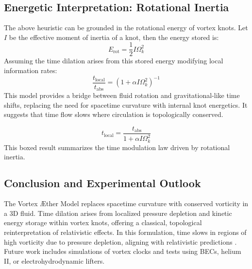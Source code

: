 \subsection{Energetic Interpretation: Rotational Inertia}
The above heuristic can be grounded in the rotational energy of vortex knots. Let $I$ be the effective moment of inertia of a knot, then the energy stored is:
\begin{equation}
    E_\text{rot} = \frac{1}{2} I \Omega_k^2
\end{equation}
Assuming the time dilation arises from this stored energy modifying local information rates:
\begin{equation}
    \frac{t_{\text{local}}}{t_{\text{abs}}} = \left(1 + \alpha I \Omega_k^2 \right)^{-1}
\end{equation}
This model provides a bridge between fluid rotation and gravitational-like time shifts, replacing the need for spacetime curvature with internal knot energetics. It suggests that time flow slows where circulation is topologically conserved.

\begin{equation}
    \boxed{
        t_{\text{local}} = \frac{t_{\text{abs}}}{1 + \alpha I \Omega_k^2}
    }
\end{equation}
This boxed result summarizes the time modulation law driven by rotational inertia.

\subsection{Conclusion and Experimental Outlook}
The Vortex Æther Model replaces spacetime curvature with conserved vorticity in a 3D fluid. Time dilation arises from localized pressure depletion and kinetic energy storage within vortex knots, offering a classical, topological reinterpretation of relativistic effects. In this formulation, time slows in regions of high vorticity due to pressure depletion, aligning with relativistic predictions \cite{fedi2017gravity, simula2020gravitational, winterberg1990maxwell}. Future work includes simulations of vortex clocks and tests using BECs, helium II, or electrohydrodynamic lifters.


